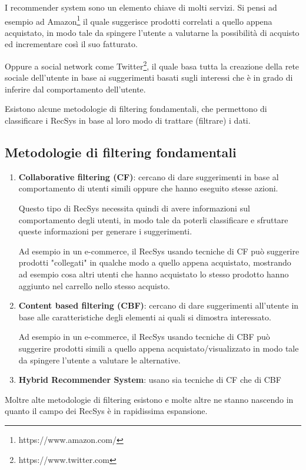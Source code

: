 I recommender system sono un elemento chiave di molti servizi. Si pensi ad esempio ad Amazon\footnote{https://www.amazon.com/} il quale suggerisce prodotti correlati a quello appena
acquistato, in modo tale da spingere l'utente a valutarne la possibilità di acquisto ed incrementare così il suo fatturato.

Oppure a social network come Twitter\footnote{https://www.twitter.com}, il quale basa tutta la creazione della rete sociale dell'utente in base ai suggerimenti basati sugli interessi che è in grado di inferire dal comportamento dell'utente.

Esistono alcune metodologie di filtering fondamentali, che permettono di classificare i RecSys in base al loro modo di trattare (filtrare) i dati.

\subsection{Metodologie di filtering fondamentali}
\begin{enumerate}
    \item \textbf{Collaborative filtering (CF)}: cercano di dare suggerimenti in base al comportamento di utenti simili oppure che hanno eseguito stesse azioni.

        Questo tipo di RecSys necessita quindi di avere informazioni sul comportamento degli utenti, in modo tale da poterli classificare e sfruttare queste informazioni per generare i suggerimenti.

        Ad esempio in un e-commerce, il RecSys usando tecniche di CF può suggerire prodotti "collegati" in qualche modo a quello appena acquistato, mostrando ad esempio cosa altri utenti che hanno acquistato lo stesso prodotto hanno aggiunto nel carrello nello stesso acquisto.

    \item \textbf{Content based filtering (CBF)}: cercano di dare suggerimenti all'utente in base alle caratteristiche degli elementi ai quali si dimostra interessato.

        Ad esempio in un e-commerce, il RecSys usando tecniche di CBF può suggerire prodotti simili a quello appena acquistato/visualizzato in modo tale da spingere l'utente a valutare le alternative.
    \item \textbf{Hybrid Recommender System}: usano sia tecniche di CF che di CBF
\end{enumerate}
Moltre alte metodologie di filtering esistono e molte altre ne stanno nascendo in quanto il campo dei RecSys è in rapidissima espansione.
\clearpage
